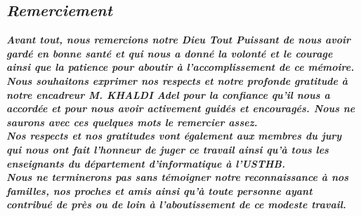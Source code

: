 \begin{center}

\chapter*{\textit{Remerciement}}

\end{center}
	
	
	\textbf{\textit{Avant tout, nous remercions notre Dieu Tout Puissant de nous avoir gardé en bonne santé et qui nous a donné la volonté et le courage ainsi que la patience pour aboutir à l'accomplissement de ce mémoire.}}\\


	\textbf{\textit{Nous souhaitons exprimer nos respects et notre profonde gratitude à notre encadreur M. KHALDI Adel pour la confiance qu'il nous a accordée et pour nous avoir activement guidés et encouragés. Nous ne saurons avec ces quelques mots le remercier assez.}}\\



	\textbf{\textit{Nos respects et nos gratitudes vont également aux membres du jury qui nous ont fait l'honneur de juger ce travail ainsi  qu'à tous  les enseignants du département d'informatique à l'USTHB.}}\\


	\textbf{\textit{Nous ne terminerons pas sans témoigner notre reconnaissance à nos familles, nos proches et amis ainsi qu'à toute personne ayant contribué de près ou de loin à l'aboutissement de ce modeste travail.}}

